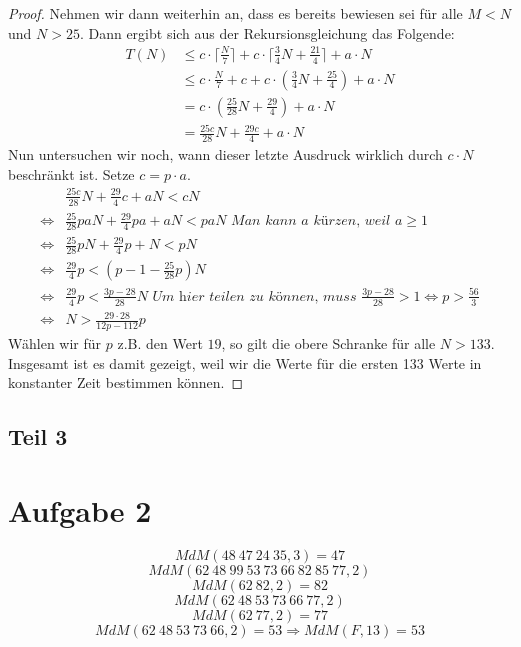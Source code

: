 \documentclass[10pt,a4paper]{article}
\begin{document}
\begin{proof}
  Nehmen wir dann weiterhin an, dass es bereits bewiesen sei für alle $M < N$ und $N > 25$.
  Dann ergibt sich aus der Rekursionsgleichung das Folgende:
  \begin{align*}
    T(N) & \le c \cdot \lceil \frac{N}{7} \rceil + c \cdot \lceil \frac{3}{4}N + \frac{21}{4} \rceil + a \cdot N\\
    & \le c \cdot \frac{N}{7} + c + c \cdot \left( \frac{3}{4}N + \frac{25}{4} \right) + a \cdot N\\
    & = c \cdot \left( \frac{25}{28}N + \frac{29}{4} \right) + a \cdot N\\
    & = \frac{25c}{28}N + \frac{29c}{4} + a \cdot N
  \end{align*}
  Nun untersuchen wir noch, wann dieser letzte Ausdruck wirklich durch $c \cdot N$ beschränkt ist.
  Setze $c = p \cdot a$.
  \begin{align*}
    & \frac{25c}{28}N + \frac{29}{4}c + aN < cN\\
    \Leftrightarrow & \frac{25}{28}paN + \frac{29}{4}pa + aN < paN \textit{ Man kann $a$ kürzen, weil $a \ge 1$}\\
    \Leftrightarrow & \frac{25}{28}pN + \frac{29}{4}p + N < pN\\
    \Leftrightarrow & \frac{29}{4}p < (p - 1 - \frac{25}{28}p)N\\
    \Leftrightarrow & \frac{29}{4}p < \frac{3p - 28}{28}N \textit{ Um hier teilen zu können, muss $\frac{3p - 28}{28} > 1 \Leftrightarrow p > \frac{56}{3}$}\\
    \Leftrightarrow & N > \frac{29 \cdot 28}{12p - 112}p
  \end{align*}
  Wählen wir für $p$ z.B. den Wert $19$, so gilt die obere Schranke für alle $N > 133$.
  Insgesamt ist es damit gezeigt, weil wir die Werte für die ersten 133 Werte in konstanter Zeit bestimmen können.
\end{proof}

\subsection{Teil 3}

\section{Aufgabe 2}

\begin{equation}
  MdM(48\ 47\ 24\ 35, 3) = 47
\end{equation}
\begin{equation}
  MdM(62\ 48\ 99\ 53\ 73\ 66\ 82\ 85\ 77, 2)
\end{equation}
\begin{equation}
  MdM(62\ 82, 2) = 82
\end{equation}
\begin{equation}
  MdM(62\ 48\ 53\ 73\ 66\ 77, 2)
\end{equation}
\begin{equation}
  MdM(62\ 77, 2) = 77
\end{equation}
\begin{equation}
  MdM(62\ 48\ 53\ 73\ 66, 2) = 53 \Rightarrow MdM(F, 13) = 53
\end{equation}
\end{document}

